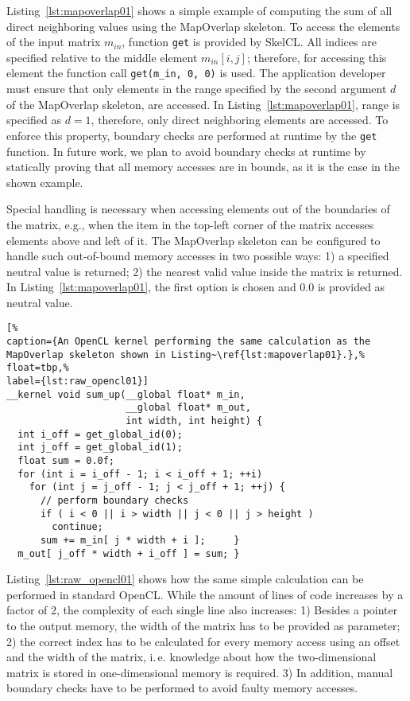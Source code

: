 Listing~\ref{lst:mapoverlap01} shows a simple example of computing the sum of all direct neighboring values using the MapOverlap skeleton.
To access the elements of the input matrix $m_{in}$, function \texttt{get} is provided by SkelCL.
All indices are specified relative to the middle element $m_{in}[i,j]$; therefore, for accessing this element the function call \texttt{get(m\_in, 0, 0)} is used.
The application developer must ensure that only elements in the range specified by the second argument $d$ of the MapOverlap skeleton, are accessed.
In Listing~\ref{lst:mapoverlap01}, range is specified as $d=1$, therefore, only direct neighboring elements are accessed.
To enforce this property, boundary checks are performed at runtime by the \texttt{get} function.
In future work, we plan to avoid boundary checks at runtime by statically proving that all memory accesses are in bounds, as it is the case in the shown example.


Special handling is necessary when accessing elements out of the boundaries of the matrix, e.g., when the item in the top-left corner of the matrix accesses elements above and left of it.
The MapOverlap skeleton can be configured to handle such out-of-bound memory accesses in two possible ways:
1) a specified neutral value is returned;
2) the nearest valid value inside the matrix is returned.
In Listing~\ref{lst:mapoverlap01}, the first option is chosen and $0.0$ is provided as neutral value.

\begin{lstlisting}[%
caption={An OpenCL kernel performing the same calculation as the MapOverlap skeleton shown in Listing~\ref{lst:mapoverlap01}.},%
float=tbp,%
label={lst:raw_opencl01}]
__kernel void sum_up(__global float* m_in,
                     __global float* m_out,
                     int width, int height) {
  int i_off = get_global_id(0); 
  int j_off = get_global_id(1);
  float sum = 0.0f;
  for (int i = i_off - 1; i < i_off + 1; ++i)
    for (int j = j_off - 1; j < j_off + 1; ++j) {
      // perform boundary checks
      if ( i < 0 || i > width || j < 0 || j > height )
        continue;
      sum += m_in[ j * width + i ];     }
  m_out[ j_off * width + i_off ] = sum; }
\end{lstlisting}


Listing~\ref{lst:raw_opencl01} shows how the same simple calculation can be performed in standard OpenCL.
While the amount of lines of code increases by a factor of 2, the complexity of each single line also increases:
1) Besides a pointer to the output memory, the width of the matrix has to be provided as parameter; 2) the correct index has to be calculated for every memory access using an offset and the width of the matrix, i.\,e.
knowledge about how the two-dimensional matrix is stored in one-dimensional memory is required.
3) In addition, manual boundary checks have to be performed to avoid faulty memory accesses. 


